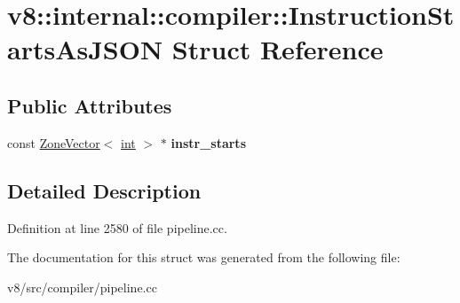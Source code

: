 \hypertarget{structv8_1_1internal_1_1compiler_1_1InstructionStartsAsJSON}{}\section{v8\+:\+:internal\+:\+:compiler\+:\+:Instruction\+Starts\+As\+J\+S\+ON Struct Reference}
\label{structv8_1_1internal_1_1compiler_1_1InstructionStartsAsJSON}
\subsection*{Public Attributes}
\begin{DoxyCompactItemize}
\item 
\mbox{\label{structv8_1_1internal_1_1compiler_1_1InstructionStartsAsJSON_a6a083821c35b327a9b8951d1f58e43f7}} 
const \mbox{\hyperlink{classv8_1_1internal_1_1ZoneVector}{Zone\+Vector}}$<$ \mbox{\hyperlink{classint}{int}} $>$ $\ast$ {\bfseries instr\+\_\+starts}
\end{DoxyCompactItemize}


\subsection{Detailed Description}


Definition at line 2580 of file pipeline.\+cc.



The documentation for this struct was generated from the following file\+:\begin{DoxyCompactItemize}
\item 
v8/src/compiler/pipeline.\+cc\end{DoxyCompactItemize}
